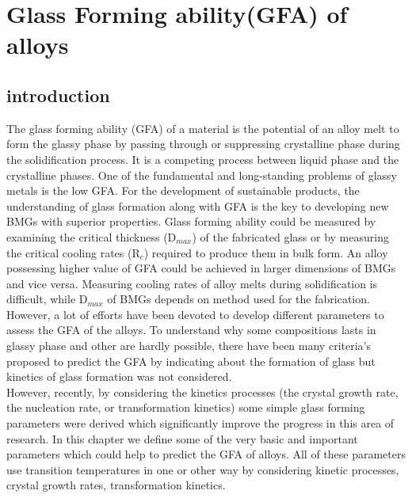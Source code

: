 

\chapter{Glass Forming ability(GFA) of alloys}

\section{introduction}
The glass forming ability (GFA) of a material is the potential of an alloy melt to form the glassy phase by passing through or suppressing crystalline phase during the solidification process. It is a competing process between liquid phase and the crystalline phases. One of the fundamental and long-standing problems of glassy metals is the low GFA. For the development of sustainable products, the understanding of glass formation along with GFA is the key to developing new BMGs with superior properties. Glass forming ability could be measured by examining the critical thickness (D$_{max}$) of the fabricated glass or by measuring the critical cooling rates (R$_c$) required to produce them in bulk form. An alloy possessing higher value of GFA could be achieved in larger dimensions of BMGs and vice versa. Measuring cooling rates of alloy melts during solidification is difficult, while D$_{max}$ of BMGs depends on method used for the fabrication. However, a lot of efforts have been devoted to develop different parameters to assess the GFA of the alloys. To understand why some compositions lasts in glassy phase and other are hardly possible, there have been many criteria’s proposed to predict the GFA by indicating about the formation of glass but kinetics of glass formation was not considered. 
\\However, recently, by considering the kinetics processes (the crystal growth rate, the nucleation rate, or transformation kinetics) some simple glass forming parameters were derived which significantly improve the progress in this area of research. In this chapter we define some of the very basic and important parameters which could help to predict the GFA of alloys. All of these parameters use transition temperatures in one or other way by considering kinetic processes, crystal growth rates, transformation kinetics. 

